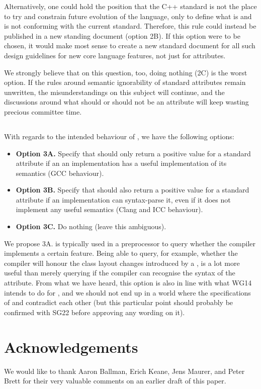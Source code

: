 Alternatively, one could hold the position that the C++ standard is not the place to try and constrain future evolution of the language, only to define what is and is not conforming with the current standard. Therefore, this rule could instead be published in a new standing document (option 2B). If this option were to be chosen, it would make most sense to create a new standard document for all such design guidelines for new core language features, not just for attributes.

We strongly believe that on this question, too, doing nothing (2C) is the worst option. If the rules around semantic ignorability of standard attributes remain unwritten, the misunderstandings on this subject will continue, and the discussions around what should or should not be an attribute will keep wasting precious committee time.

\subsection{}

With regards to the intended behaviour of , we have the following options:

\begin{itemize}
\item \textbf{Option 3A.} Specify that  should only return a positive value for a standard attribute if an an implementation has a useful implementation of its semantics (GCC behaviour).
\item \textbf{Option 3B.} Specify that  should also return a positive value for a standard attribute if an implementation can syntax-parse it, even if it does not implement any useful semantics (Clang and ICC behaviour).
\item \textbf{Option 3C.} Do nothing (leave this ambiguous).
\end{itemize}

We propose 3A.  is typically used in a preprocessor  to query whether the compiler implements a certain feature. Being able to query, for example, whether the compiler will honour the class layout changes introduced by a , is a lot more useful than merely querying if the compiler can recognise the syntax of the attribute. From what we have heard, this option is also in line with what WG14 intends to do for , and we should not end up in a world where the specifications of  and  contradict each other (but this particular point should probably be confirmed with SG22 before approving any wording on it).

\section*{Acknowledgements}
We would like to thank Aaron Ballman, Erich Keane, Jens Maurer, and Peter Brett for their very valuable comments on an earlier draft of this paper.

\renewcommand{\bibname}{References}




